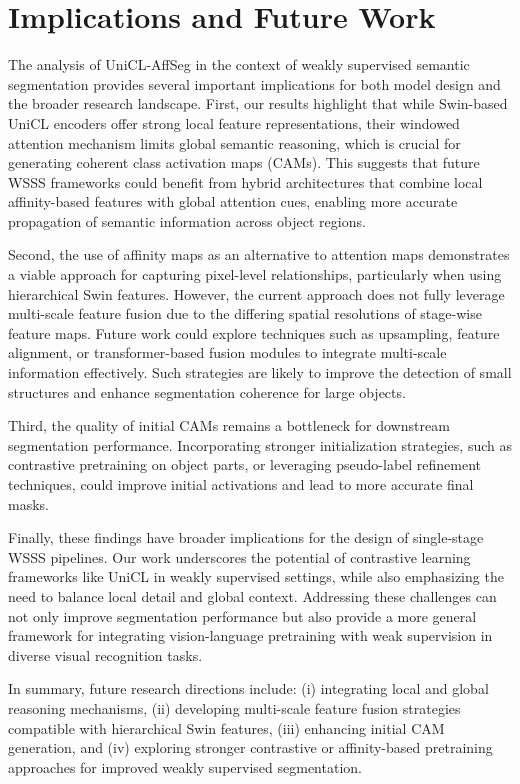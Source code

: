 
\section{Implications and Future Work}
\label{sec:implications_and_future_work}
The analysis of UniCL-AffSeg  in the context of weakly supervised semantic segmentation provides several important implications for both model design and the broader research landscape. First, our results highlight that while Swin-based UniCL encoders offer strong local feature representations, their windowed attention mechanism limits global semantic reasoning, which is crucial for generating coherent class activation maps (CAMs). This suggests that future WSSS frameworks could benefit from hybrid architectures that combine local affinity-based features with global attention cues, enabling more accurate propagation of semantic information across object regions.  

Second, the use of affinity maps as an alternative to attention maps demonstrates a viable approach for capturing pixel-level relationships, particularly when using hierarchical Swin features. However, the current approach does not fully leverage multi-scale feature fusion due to the differing spatial resolutions of stage-wise feature maps. Future work could explore techniques such as upsampling, feature alignment, or transformer-based fusion modules to integrate multi-scale information effectively. Such strategies are likely to improve the detection of small structures and enhance segmentation coherence for large objects.  

Third, the quality of initial CAMs remains a bottleneck for downstream segmentation performance. Incorporating stronger initialization strategies, such as contrastive pretraining on object parts, or leveraging pseudo-label refinement techniques, could improve initial activations and lead to more accurate final masks.  

Finally, these findings have broader implications for the design of single-stage WSSS pipelines. Our work underscores the potential of contrastive learning frameworks like UniCL in weakly supervised settings, while also emphasizing the need to balance local detail and global context. Addressing these challenges can not only improve segmentation performance but also provide a more general framework for integrating vision-language pretraining with weak supervision in diverse visual recognition tasks.  

In summary, future research directions include: (i) integrating local and global reasoning mechanisms, (ii) developing multi-scale feature fusion strategies compatible with hierarchical Swin features, (iii) enhancing initial CAM generation, and (iv) exploring stronger contrastive or affinity-based pretraining approaches for improved weakly supervised segmentation.
